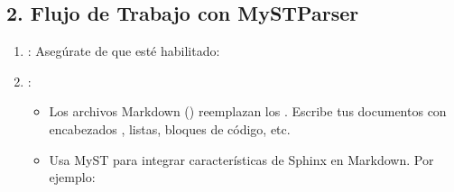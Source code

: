 \documentclass[a4paper,10pt,spanish]{sphinxmanual}
\begin{document}
\subsection{2. Flujo de Trabajo con MyST\sphinxhyphen{}Parser}
\label{\detokenize{configuracion_inicial/004.estructura_inicial_proyecto:flujo-de-trabajo-con-myst-parser}}\begin{enumerate}
%
\item {} 
\sphinxAtStartPar
{}: Asegúrate de que  esté habilitado:

\begin{sphinxVerbatim}[commandchars=\\\{\}]
  \PYG{p}{[}\PYG{p}{]}
  
     
\end{sphinxVerbatim}

\item {} 
\sphinxAtStartPar
{}:
\begin{itemize}
\item {} 
\sphinxAtStartPar
Los archivos Markdown () reemplazan los . Escribe tus documentos con encabezados \sphinxcode{\sphinxupquote{\#}}, listas, bloques de código, etc.

\item {} 
\sphinxAtStartPar
Usa MyST para integrar características de Sphinx en Markdown. Por ejemplo:

\begin{sphinxVerbatim}[commandchars=\\\{\}]

 

\end{sphinxVerbatim}

\end{itemize}


\end{enumerate}
\end{document}
